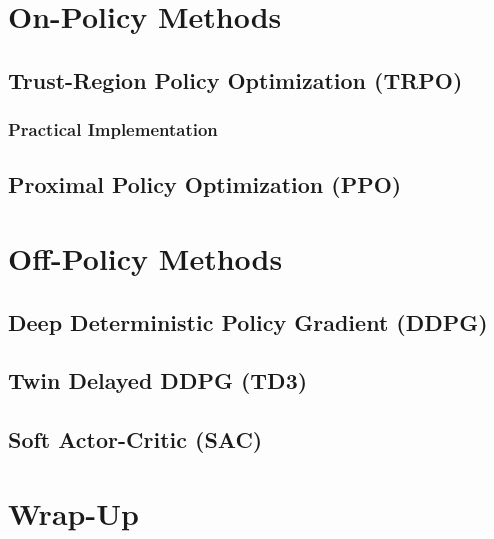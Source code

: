     \section{On-Policy Methods} %

        \subsection{Trust-Region Policy Optimization (TRPO)} %

            \subsubsection{Practical Implementation} %

        \subsection{Proximal Policy Optimization (PPO)} %

    \section{Off-Policy Methods} %

        \subsection{Deep Deterministic Policy Gradient (DDPG)} %

        \subsection{Twin Delayed DDPG (TD3)} %

        \subsection{Soft Actor-Critic (SAC)} %

    \section{Wrap-Up} %

